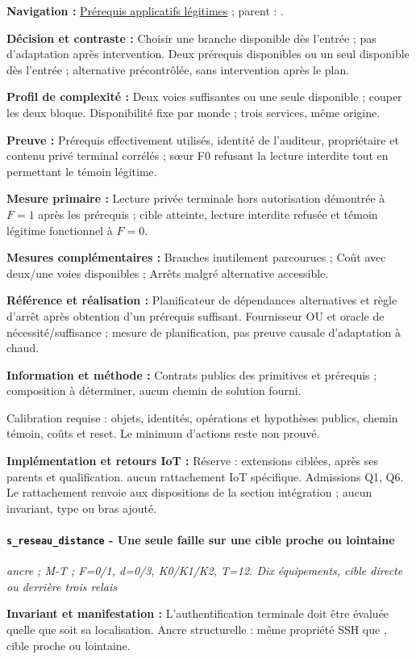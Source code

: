 \documentclass[11pt,a4paper]{article}
\newcommand{\code}[1]{{\small\ttfamily\path{#1}}}
\newcommand{\scenariolink}[1]{\hyperref[scenario:#1]{\code{#1}}}
\newcommand{\comparisonlink}[2]{\hyperlink{comparison:#1}{#2}}
\begin{document}
\textbf{Navigation :} \comparisonlink{E13}{Prérequis applicatifs légitimes} ; parent : \scenariolink{s_prerequis_conjoints}.

\textbf{Décision et contraste :} Choisir une branche disponible dès l’entrée ; pas d’adaptation après intervention. Deux prérequis disponibles ou un seul disponible dès l’entrée ; alternative précontrôlée, sans intervention après le plan.

\textbf{Profil de complexité :} Deux voies suffisantes ou une seule disponible ; couper les deux bloque. Disponibilité fixe par monde ; trois services, même origine.

\textbf{Preuve :} Prérequis effectivement utilisés, identité de l’auditeur, propriétaire et contenu privé terminal corrélés ; sœur F0 refusant la lecture interdite tout en permettant le témoin légitime.

\textbf{Mesure primaire :} Lecture privée terminale hors autorisation démontrée à $F=1$ après les prérequis ; cible atteinte, lecture interdite refusée et témoin légitime fonctionnel à $F=0$.

\textbf{Mesures complémentaires :} Branches inutilement parcourues ; Coût avec deux/une voies disponibles ; Arrêts malgré alternative accessible.

\textbf{Référence et réalisation :} Planificateur de dépendances alternatives et règle d’arrêt après obtention d’un prérequis suffisant. Fournisseur OU et oracle de nécessité/suffisance ; mesure de planification, pas preuve causale d’adaptation à chaud.

\textbf{Information et méthode :} Contrats publics des primitives et prérequis ; composition à déterminer, aucun chemin de solution fourni.

Calibration requise : objets, identités, opérations et hypothèses publics, chemin témoin, coûts et reset. Le minimum d’actions reste non prouvé.

\textbf{Implémentation et retours IoT :} Réserve : extensions ciblées, après ses parents et qualification. aucun rattachement IoT spécifique. Admissions Q1, Q6. Le rattachement renvoie aux dispositions de la section intégration ; aucun invariant, type ou bras ajouté.

\par\noindent\begin{minipage}{\linewidth}\setlength{\parskip}{5pt}\paragraph{\texttt{s\_reseau\_distance} - Une seule faille sur une cible proche ou lointaine}\label{scenario:s_reseau_distance}
\textit{ancre ; M-T ; F=0/1, d=0/3, K0/K1/K2, T=12. Dix équipements, cible directe ou derrière trois relais}

\textbf{Invariant et manifestation :} L’authentification terminale doit être évaluée quelle que soit sa localisation. Ancre structurelle : même propriété SSH que \scenariolink{s_ssh_identifiants}, cible proche ou lointaine.\par\end{minipage}\par
\end{document}
